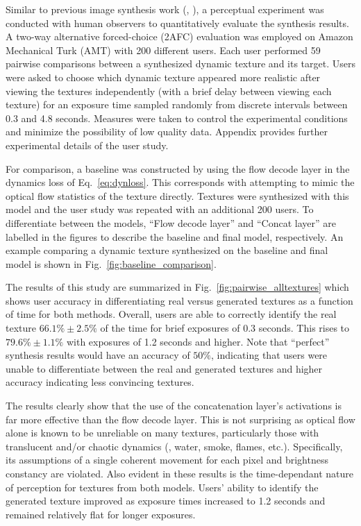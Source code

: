 Similar to previous image synthesis work (\eg, \cite{chen2017}), 
a perceptual experiment was conducted with human observers to 
quantitatively evaluate the synthesis results.
A two-way alternative forced-choice (2AFC) evaluation was employed on Amazon Mechanical
Turk (AMT) with 200 different users. Each user performed 59
pairwise comparisons between a synthesized dynamic texture and 
its target.
Users were asked to choose which dynamic texture appeared more realistic
after viewing the textures independently (with a brief delay between viewing each texture) for an exposure time sampled
randomly from discrete intervals between 0.3 and 4.8 seconds.
Measures were taken to control the experimental conditions and
minimize the possibility of low quality data.
Appendix  provides further experimental
details of the user study.

For comparison, a baseline was constructed by using the 
flow decode layer in the dynamics loss of Eq.\ \ref{eq:dynloss}.
This corresponds with attempting to mimic the optical flow 
statistics of the texture directly.
Textures were synthesized with this model and the user study
was repeated with an additional 200 users.
To differentiate between the models, ``Flow decode layer'' 
and ``Concat layer'' are labelled in the figures to describe the
baseline and final model, respectively. An example comparing a dynamic texture synthesized on the baseline and final model is shown in Fig.\ \ref{fig:baseline_comparison}.



The results of this study are summarized in
Fig.\ \ref{fig:pairwise_alltextures} which shows user accuracy in
differentiating real versus generated textures as a function of
time for both methods.
Overall, users are able to correctly identify the real texture
$66.1\% \pm 2.5\%$ of the time for brief 
exposures of 0.3 seconds.
This rises to $79.6\% \pm 1.1\%$ with exposures of 1.2 seconds 
and higher.
Note that ``perfect'' synthesis results would have an accuracy
of $50\%$, indicating that users were unable to differentiate 
between the real and generated textures and higher accuracy 
indicating less convincing textures.



The results clearly show that the use of the concatenation 
layer's activations is far more effective than the flow decode 
layer.
This is not surprising as optical flow alone is known to be 
unreliable on many textures, particularly those with
translucent and/or chaotic dynamics (\eg, water, smoke, flames, etc.). Specifically, its assumptions of a single coherent movement for each pixel and brightness constancy are violated.
Also evident in these results is the time-dependant nature of 
perception for textures from both models.
Users' ability to identify the generated texture improved as 
exposure times increased to 1.2 seconds and remained relatively 
flat for longer exposures.

